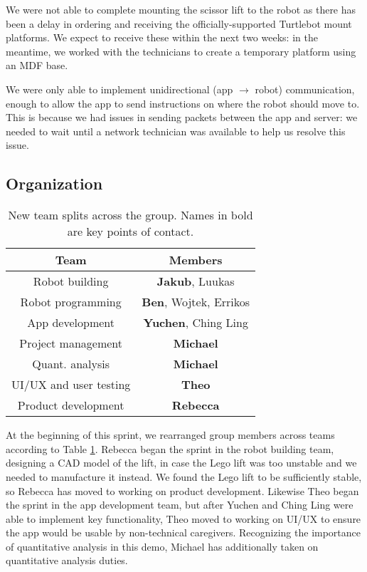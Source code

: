 \documentclass{article}
\begin{document}
We were not able to complete mounting the scissor lift to the robot as there has been a delay in ordering and receiving the officially-supported Turtlebot mount platforms. We expect to receive these within the next two weeks: in the meantime, we worked with the technicians to create a temporary platform using an MDF base.

We were only able to implement unidirectional (app $\rightarrow$ robot) communication, enough to allow the app to send instructions on where the robot should move to. This is because we had issues in sending packets between the app and server: we needed to wait until a network technician was available to help us resolve this issue. 


\subsection{Organization}
\begin{table}[]
  \begin{tabular}{c|c}
    Team & Members \\
    \hline
    Robot building & {\bf Jakub}, Luukas \\
    Robot programming & {\bf Ben}, Wojtek, Errikos \\
    App development & {\bf Yuchen}, Ching Ling \\
    Project management & {\bf Michael}  \\
    Quant. analysis & {\bf Michael} \\
    UI/UX and user testing & {\bf Theo}  \\
    Product development & {\bf Rebecca}  
  \end{tabular}
  \caption{New team splits across the group. Names in bold are key points of contact.}
  \label{tab:group-split}
\end{table}

At the beginning of this sprint, we rearranged group members across teams according to Table \ref{tab:group-split}. Rebecca began the sprint in the robot building team, designing a CAD model of the lift, in case the Lego lift was too unstable and we needed to manufacture it instead. We found the Lego lift to be sufficiently stable, so Rebecca has moved to working on product development. Likewise Theo began the sprint in the app development team, but after Yuchen and Ching Ling were able to implement key functionality, Theo moved to working on UI/UX to ensure the app would be usable by non-technical caregivers. Recognizing the importance of quantitative analysis in this demo, Michael has additionally taken on quantitative analysis duties. 
\end{document}
